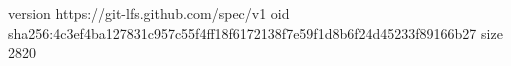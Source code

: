 version https://git-lfs.github.com/spec/v1
oid sha256:4c3ef4ba127831c957c55f4ff18f6172138f7e59f1d8b6f24d45233f89166b27
size 2820
